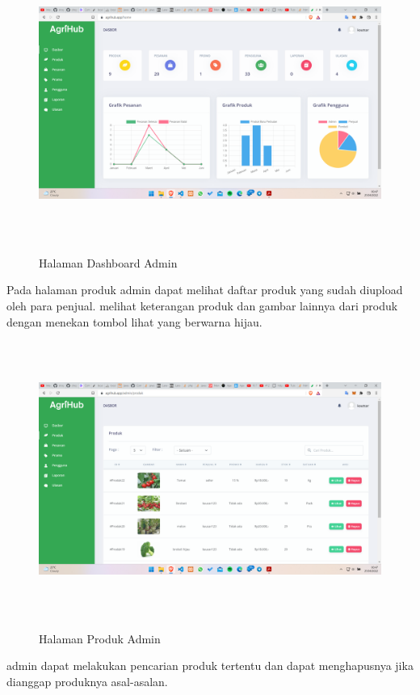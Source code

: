 \begin{enumerate}
\begin{enumerate}
			\begin{figure}[H]
				\centering
				{\includegraphics [width = 14.3cm, height= 9cm]{gambar/admin/dashboard_admin}}
				\caption{Halaman Dashboard Admin}
				\label{dashboard_admin}
			\end{figure}

			Pada halaman produk admin dapat melihat daftar produk yang sudah diupload oleh para penjual. melihat keterangan produk dan gambar lainnya dari produk dengan menekan tombol lihat yang berwarna hijau.

			\begin{figure}[H]
				\centering
				{\includegraphics [width = 14.3cm, height= 9cm]{gambar/admin/produk_admin}}
				\caption{Halaman Produk Admin}
				\label{produk_admin}
			\end{figure}

			\par admin dapat melakukan pencarian produk tertentu dan dapat menghapusnya jika dianggap produknya asal-asalan.


\end{enumerate}
\end{enumerate}

